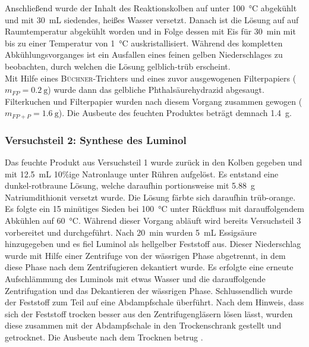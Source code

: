 Anschließend wurde der Inhalt des Reaktionskolben auf unter \SI{100}{\celsius} abgekühlt und mit \SI{30}{\milli \liter} siedendes, heißes Wasser versetzt. Danach ist die Lösung auf auf Raumtemperatur abgekühlt worden und in Folge dessen mit Eis für \SI{30}{\minute} mit bis zu einer Temperatur von \SI{1}{\celsius} auskristallisiert. Während des kompletten Abkühlungsvorganges ist ein Ausfallen eines feinen gelben Niederschlages zu beobachten, durch welchen die Lösung gelblich-trüb erscheint.\\
Mit Hilfe eines \textsc{Büchner}-Trichters und eines zuvor ausgewogenen Filterpapiers ($m_{FP}=\SI{0,2}{\gram}$) wurde dann das gelbliche Phthalsäurehydrazid abgesaugt. Filterkuchen und Filterpapier wurden nach diesem Vorgang zusammen gewogen ($m_{FP+P}=\SI{1,6}{\gram}$).
Die Ausbeute des feuchten Produktes beträgt demnach \SI{1,4}{\gram}.

\subsubsection*{Versuchsteil 2: Synthese des Luminol}
Das feuchte Produkt aus Versuchsteil 1 wurde zurück in den Kolben gegeben und mit \SI{12,5}{\milli \liter} 10\%ige Natronlauge unter Rühren aufgelöst. Es entstand eine dunkel-rotbraune Lösung, welche daraufhin portionsweise mit \SI{5,88}{\gram} Natriumdithionit versetzt wurde. Die Lösung färbte sich daraufhin trüb-orange. Es folgte ein 15 minütiges Sieden bei \SI{100}{\celsius} unter Rückfluss mit darauffolgendem Abkühlen auf \SI{60}{\celsius}. Während dieser Vorgang abläuft wird bereits Versuchsteil 3 vorbereitet und durchgeführt. Nach \SI{20}{\minute} wurden \SI{5}{\milli \liter} Essigsäure hinzugegeben und es fiel Luminol als hellgelber Feststoff aus. Dieser Niederschlag wurde mit Hilfe einer Zentrifuge von der wässrigen Phase abgetrennt, in dem diese Phase nach dem Zentrifugieren dekantiert wurde. Es erfolgte eine erneute Aufschlämmung des Luminols mit etwas Wasser und die darauffolgende Zentrifugation und das Dekantieren der wässrigen Phase. Schlussendlich wurde der Feststoff zum Teil auf eine Abdampfschale überführt. Nach dem Hinweis, dass sich der Feststoff trocken besser aus den Zentrifugengläsern lösen lässt, wurden diese zusammen mit der Abdampfschale in den Trockenschrank gestellt und getrocknet.
Die Ausbeute nach dem Trocknen betrug .

